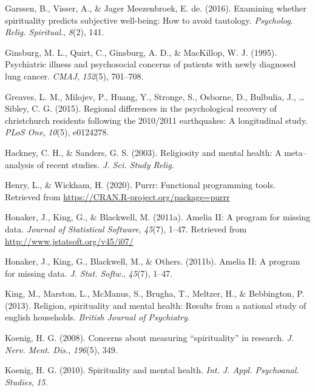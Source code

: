 \documentclass[
  english,
  man,floatsintext]{apa6}
\begin{document}
\leavevmode\hypertarget{ref-Garssen2016-kb}{}%
Garssen, B., Visser, A., \& Jager Meezenbroek, E. de. (2016). Examining whether spirituality predicts subjective well-being: How to avoid tautology. \emph{Psycholog. Relig. Spiritual.}, \emph{8}(2), 141.

\leavevmode\hypertarget{ref-Ginsburg1995-jr}{}%
Ginsburg, M. L., Quirt, C., Ginsburg, A. D., \& MacKillop, W. J. (1995). Psychiatric illness and psychosocial concerns of patients with newly diagnosed lung cancer. \emph{CMAJ}, \emph{152}(5), 701--708.

\leavevmode\hypertarget{ref-greaves2015regional}{}%
Greaves, L. M., Milojev, P., Huang, Y., Stronge, S., Osborne, D., Bulbulia, J., \ldots{} Sibley, C. G. (2015). Regional differences in the psychological recovery of christchurch residents following the 2010/2011 earthquakes: A longitudinal study. \emph{PLoS One}, \emph{10}(5), e0124278.

\leavevmode\hypertarget{ref-Hackney2003-rs}{}%
Hackney, C. H., \& Sanders, G. S. (2003). Religiosity and mental health: A meta--analysis of recent studies. \emph{J. Sci. Study Relig.}

\leavevmode\hypertarget{ref-R-purrr}{}%
Henry, L., \& Wickham, H. (2020). Purrr: Functional programming tools. Retrieved from \url{https://CRAN.R-project.org/package=purrr}

\leavevmode\hypertarget{ref-R-Amelia}{}%
Honaker, J., King, G., \& Blackwell, M. (2011a). Amelia II: A program for missing data. \emph{Journal of Statistical Software}, \emph{45}(7), 1--47. Retrieved from \url{http://www.jstatsoft.org/v45/i07/}

\leavevmode\hypertarget{ref-Honaker2011-yu}{}%
Honaker, J., King, G., Blackwell, M., \& Others. (2011b). Amelia II: A program for missing data. \emph{J. Stat. Softw.}, \emph{45}(7), 1--47.

\leavevmode\hypertarget{ref-King2013-cg}{}%
King, M., Marston, L., McManus, S., Brugha, T., Meltzer, H., \& Bebbington, P. (2013). Religion, spirituality and mental health: Results from a national study of english households. \emph{British Journal of Psychiatry}.

\leavevmode\hypertarget{ref-Koenig2008-lv}{}%
Koenig, H. G. (2008). Concerns about measuring ``spirituality'' in research. \emph{J. Nerv. Ment. Dis.}, \emph{196}(5), 349.

\leavevmode\hypertarget{ref-Koenig2010-gk}{}%
Koenig, H. G. (2010). Spirituality and mental health. \emph{Int. J. Appl. Psychoanal. Studies}, \emph{15}.
\end{document}
